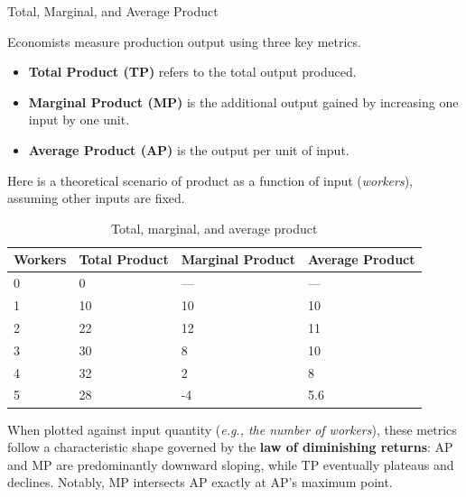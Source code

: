 \documentclass[10pt]{article}
\begin{document}
    \begin{core}{Total, Marginal, and Average Product}

      Economists measure production output using three key metrics.

      \begin{itemize}

        \item \textbf{Total Product (TP)} refers to the total output produced.

        \item \textbf{Marginal Product (MP)} is the additional output gained by increasing one input by one unit.

        \item \textbf{Average Product (AP)} is the output per unit of input.

      \end{itemize}

      Here is a theoretical scenario of product as a function of input (\textit{workers}), assuming other inputs are fixed.

      \begin{table}[H]
        \centering
        \begin{tabular}{llll}
          \hline
          \hline
          \textbf{Workers} & \textbf{Total Product} & \textbf{Marginal Product} & \textbf{Average Product} \\
          \hline
          0 & 0 & --- & --- \\
          1 & 10 & 10 & 10 \\
          2 & 22 & 12 & 11 \\
          3 & 30 & 8 & 10 \\
          4 & 32 & 2 & 8 \\
          5 & 28 & -4 & 5.6 \\
          \hline
          \hline
        \end{tabular}
        \caption{Total, marginal, and average product}
        \label{tab:tamp}
      \end{table}

      When plotted against input quantity (\textit{e.g., the number of workers}), these metrics follow a characteristic shape governed by the \textbf{law of diminishing returns}: AP and MP are predominantly downward sloping, while TP eventually plateaus and declines. Notably, MP intersects AP exactly at AP's maximum point.


    \end{core}
\end{document}
